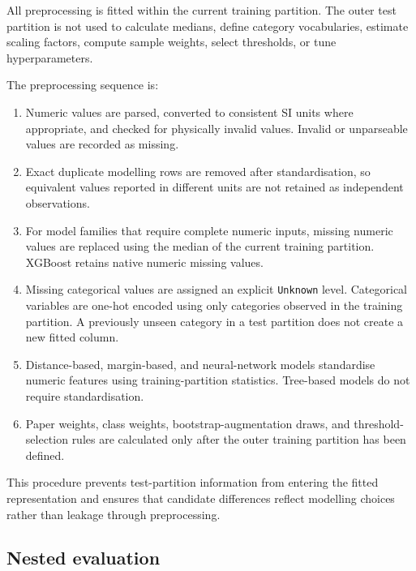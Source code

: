 All preprocessing is fitted within the current training partition. The outer
test partition is not used to calculate medians, define category vocabularies,
estimate scaling factors, compute sample weights, select thresholds, or tune
hyperparameters.

The preprocessing sequence is:

\begin{enumerate}
  \item Numeric values are parsed, converted to consistent SI units where
  appropriate, and checked for physically invalid values. Invalid or
  unparseable values are recorded as missing.

  \item Exact duplicate modelling rows are removed after standardisation, so
  equivalent values reported in different units are not retained as
  independent observations.

  \item For model families that require complete numeric inputs, missing numeric
  values are replaced using the median of the current training partition.
  XGBoost retains native numeric missing values.

  \item Missing categorical values are assigned an explicit \texttt{Unknown}
  level. Categorical variables are one-hot encoded using only categories
  observed in the training partition. A previously unseen category in a test
  partition does not create a new fitted column.

  \item Distance-based, margin-based, and neural-network models standardise
  numeric features using training-partition statistics. Tree-based models do
  not require standardisation.

  \item Paper weights, class weights, bootstrap-augmentation draws, and
  threshold-selection rules are calculated only after the outer training
  partition has been defined.
\end{enumerate}

This procedure prevents test-partition information from entering the fitted
representation and ensures that candidate differences reflect modelling choices
rather than leakage through preprocessing.

\subsection{Nested evaluation}

